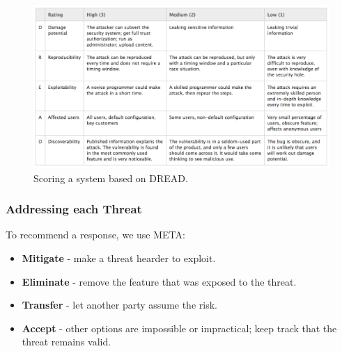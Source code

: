 \documentclass[11pt]{article}
\begin{document}
\begin{figure}[htb!]
  \centering
  \caption{Scoring a system based on DREAD.}
  \label{fig:dread}
  \includegraphics[width=\textwidth]{dread}
\end{figure}

\subsubsection{Addressing each Threat}
To recommend a response, we use META:
\begin{itemize}
  \item \textbf{Mitigate} - make a threat hearder to exploit.
  \item \textbf{Eliminate} - remove the feature that was exposed to the threat.
  \item \textbf{Transfer} - let another party assume the risk.
  \item \textbf{Accept} - other options are impossible or impractical; keep track that the threat remains valid.
\end{itemize}
\end{document}
